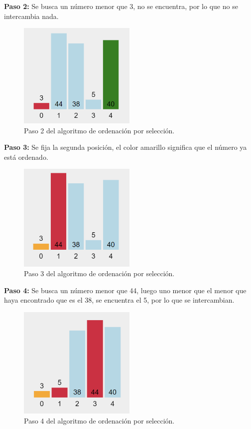 \textbf{Paso 2:} Se busca un número menor que 3, no se encuentra, por lo que no se intercambia nada.

\begin{figure}[h!]  
    \centering
    \includegraphics[width=0.5\textwidth]{./Images/oe2.png}
    \caption{Paso 2 del algoritmo de ordenación por selección.}
    \label{fig:SelectionSort2}
\end{figure}

\newpage
\textbf{Paso 3:} Se fija la segunda posición, el color amarillo significa que el número ya está ordenado.

\begin{figure}[h!]  
    \centering
    \includegraphics[width=0.5\textwidth]{./Images/oe3.png}
    \caption{Paso 3 del algoritmo de ordenación por selección.}
    \label{fig:SelectionSort3}
\end{figure}

\textbf{Paso 4:} Se busca un número menor que 44, luego uno menor que el menor que haya encontrado que es el 38, se encuentra el 5, por lo que se intercambian.

\begin{figure}[h!]  
    \centering
    \includegraphics[width=0.5\textwidth]{./Images/oe4.png}
    \caption{Paso 4 del algoritmo de ordenación por selección.}
    \label{fig:SelectionSort4}
\end{figure}

